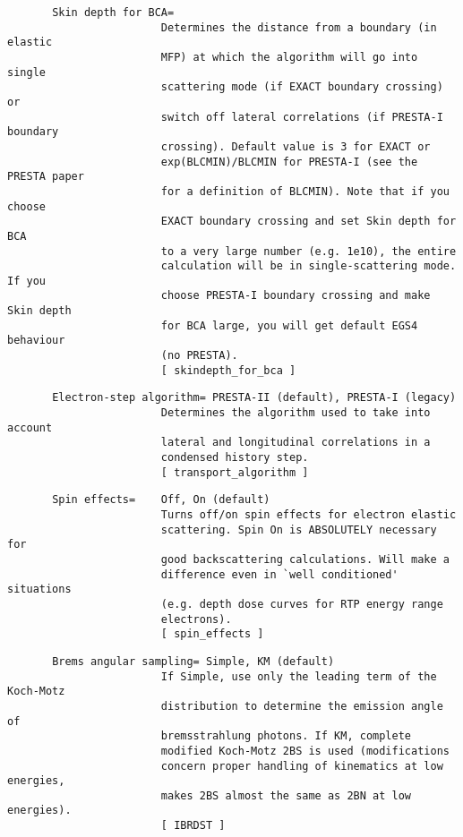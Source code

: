 \begin{verbatim}
       Skin depth for BCA=
                        Determines the distance from a boundary (in elastic
                        MFP) at which the algorithm will go into single
                        scattering mode (if EXACT boundary crossing) or
                        switch off lateral correlations (if PRESTA-I boundary
                        crossing). Default value is 3 for EXACT or
                        exp(BLCMIN)/BLCMIN for PRESTA-I (see the PRESTA paper
                        for a definition of BLCMIN). Note that if you choose
                        EXACT boundary crossing and set Skin depth for BCA
                        to a very large number (e.g. 1e10), the entire
                        calculation will be in single-scattering mode. If you
                        choose PRESTA-I boundary crossing and make Skin depth
                        for BCA large, you will get default EGS4 behaviour
                        (no PRESTA).
                        [ skindepth_for_bca ]
\end{verbatim}
\begin{verbatim}
       Electron-step algorithm= PRESTA-II (default), PRESTA-I (legacy)
                        Determines the algorithm used to take into account
                        lateral and longitudinal correlations in a
                        condensed history step.
                        [ transport_algorithm ]
\end{verbatim}
\begin{verbatim}
       Spin effects=    Off, On (default)
                        Turns off/on spin effects for electron elastic
                        scattering. Spin On is ABSOLUTELY necessary for
                        good backscattering calculations. Will make a
                        difference even in `well conditioned' situations
                        (e.g. depth dose curves for RTP energy range
                        electrons).
                        [ spin_effects ]
\end{verbatim}
\begin{verbatim}
       Brems angular sampling= Simple, KM (default)
                        If Simple, use only the leading term of the Koch-Motz
                        distribution to determine the emission angle of
                        bremsstrahlung photons. If KM, complete
                        modified Koch-Motz 2BS is used (modifications
                        concern proper handling of kinematics at low energies,
                        makes 2BS almost the same as 2BN at low energies).
                        [ IBRDST ]
\end{verbatim}
